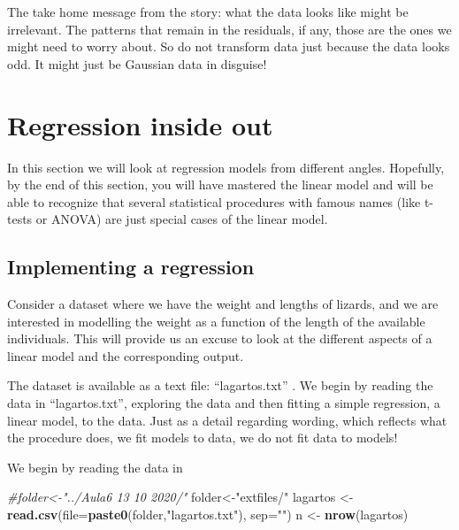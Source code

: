 \documentclass[
]{book}
\newenvironment{Shaded}{\begin{snugshade}}{\end{snugshade}}
\newcommand{\AttributeTok}[1]{\textcolor[rgb]{0.13,0.29,0.53}{#1}}
\newcommand{\CommentTok}[1]{\textcolor[rgb]{0.56,0.35,0.01}{\textit{#1}}}
\newcommand{\FunctionTok}[1]{\textcolor[rgb]{0.13,0.29,0.53}{\textbf{#1}}}
\newcommand{\NormalTok}[1]{#1}
\newcommand{\OtherTok}[1]{\textcolor[rgb]{0.56,0.35,0.01}{#1}}
\newcommand{\StringTok}[1]{\textcolor[rgb]{0.31,0.60,0.02}{#1}}
\begin{document}
The take home message from the story: what the data looks like might be irrelevant. The patterns that remain in the residuals, if any, those are the ones we might need to worry about. So do not transform data just because the data looks odd. It might just be Gaussian data in disguise!

\hypertarget{RIO}{%
\chapter{Regression inside out}\label{RIO}}

In this section we will look at regression models from different angles. Hopefully, by the end of this section, you will have mastered the linear model and will be able to recognize that several statistical procedures with famous names (like t-tests or ANOVA) are just special cases of the linear model.

\hypertarget{implementing-a-regression}{%
\section{Implementing a regression}\label{implementing-a-regression}}

Consider a dataset where we have the weight and lengths of lizards, and we are interested in modelling the weight as a function of the length of the available individuals. This will provide us an excuse to look at the different aspects of a linear model and the corresponding output.

The dataset is available as a text file: ``lagartos.txt'' . We begin by reading the data in ``lagartos.txt'', exploring the data and then fitting a simple regression, a linear model, to the data. Just as a detail regarding wording, which reflects what the procedure does, we fit models to data, we do not fit data to models!

We begin by reading the data in

\begin{Shaded}
\begin{Highlighting}[]
\CommentTok{\#folder\textless{}{-}"../Aula6 13 10 2020/"}
\NormalTok{folder}\OtherTok{\textless{}{-}}\StringTok{"extfiles/"}
\NormalTok{lagartos }\OtherTok{\textless{}{-}} \FunctionTok{read.csv}\NormalTok{(}\AttributeTok{file=}\FunctionTok{paste0}\NormalTok{(folder,}\StringTok{"lagartos.txt"}\NormalTok{), }\AttributeTok{sep=}\StringTok{""}\NormalTok{)}
\NormalTok{n }\OtherTok{\textless{}{-}} \FunctionTok{nrow}\NormalTok{(lagartos)}
\end{Highlighting}
\end{Shaded}
\end{document}
